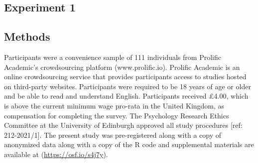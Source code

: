 \documentclass[
  donotrepeattitle,doc, 12pt, a4paper,floatsintext]{apa7}
\begin{document}
\hypertarget{experiment-1}{%
\subsection{Experiment 1}\label{experiment-1}}

\hypertarget{methods}{%
\subsection{Methods}\label{methods}}

Participants were a convenience sample of 111 individuals from Prolific Academic's crowdsourcing platform (www.prolific.io). Prolific Academic is an online crowdsourcing service that provides participants access to studies hosted on third-party websites. Participants were required to be 18 years of age or older and be able to read and understand English. Participants received £4.00, which is above the current minimum wage pro-rata in the United Kingdom, as compensation for completing the survey. The Psychology Research Ethics Committee at the University of Edinburgh approved all study procedures {[}ref: 212-2021/1{]}. The present study was pre-registered along with a copy of anonymized data along with a copy of the R code and supplemental materials are available at (\url{https://osf.io/s4j7y}).
\end{document}
